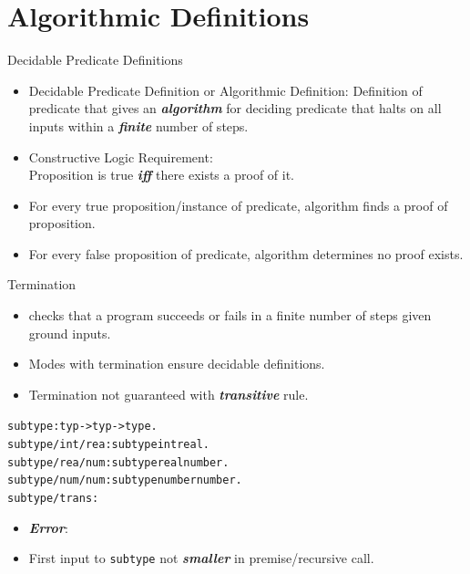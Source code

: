 \documentclass{beamer}
\renewcommand{\emph}[1]{\textbf{\textit{#1}}}
\begin{document}
\section{Algorithmic Definitions}

\begin{frame}{Decidable Predicate Definitions}
\begin{itemize}
\item Decidable Predicate Definition or Algorithmic Definition:
Definition of predicate that gives an \emph{algorithm} for
deciding predicate that halts on all inputs within a
\emph{finite} number of steps.
\item Constructive Logic Requirement: \\
Proposition is true \emph{iff} there exists a proof of it.

\pause
\item For every true proposition/instance of predicate,
algorithm finds a proof of proposition.

\item For every false proposition of predicate,
algorithm determines no proof exists.
\end{itemize}
\end{frame}

\begin{frame}[containsverbatim]{Termination}
\begin{itemize}
\item \texttt{} checks that a program
succeeds or fails in a finite number of steps given
ground inputs.
\item Modes with termination ensure decidable definitions.
\item Termination not guaranteed with \emph{transitive} rule.
\end{itemize}

\begin{alltt}
subtype : typ -> typ -> type.
subtype/int/rea : subtype int real.
subtype/rea/num : subtype real number.
subtype/num/num : subtype number number.
subtype/trans:
\end{alltt}

\begin{itemize}
\item \emph{Error}: \texttt{}
\item First input to \texttt{subtype} not \emph{smaller} in premise/recursive call.
\end{itemize}
\end{frame}
\end{document}
